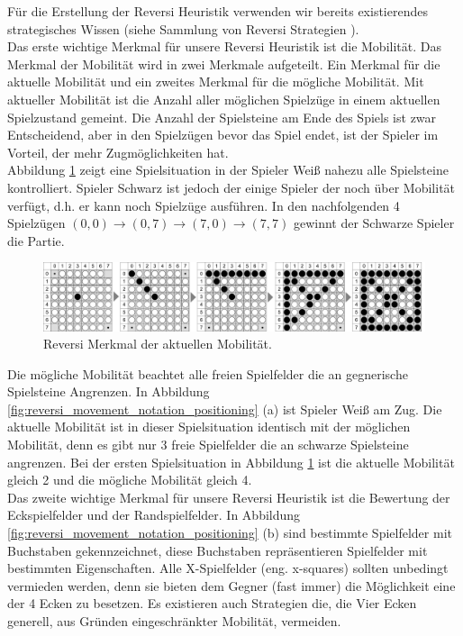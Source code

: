 Für die Erstellung der Reversi Heuristik verwenden wir bereits existierendes strategisches Wissen (siehe Sammlung von Reversi Strategien \cite{MacGuire}). \\

Das erste wichtige Merkmal für unsere Reversi Heuristik ist die Mobilität. Das Merkmal der Mobilität wird in zwei Merkmale aufgeteilt. Ein Merkmal für die aktuelle Mobilität und ein zweites Merkmal für die mögliche Mobilität. Mit aktueller Mobilität ist die Anzahl aller möglichen Spielzüge in einem aktuellen Spielzustand gemeint. Die Anzahl der Spielsteine am Ende des Spiels ist zwar Entscheidend, aber in den Spielzügen bevor das Spiel endet, ist der Spieler im Vorteil, der mehr Zugmöglichkeiten hat. \\

Abbildung \ref{fig:reversi_maximum_disk_strategy} zeigt eine Spielsituation in der Spieler Weiß nahezu alle Spielsteine kontrolliert. Spieler Schwarz ist jedoch der einige Spieler der noch über Mobilität verfügt, d.h. er kann noch Spielzüge ausführen. In den nachfolgenden 4 Spielzügen $(0,0) \rightarrow (0,7) \rightarrow (7,0) \rightarrow (7,7)$ gewinnt der Schwarze Spieler die Partie. \\

\begin{figure}[!htbp]
  \centering
  \includegraphics[scale = 0.3]{inhalt/abbildungen/reversi_maximum_disk_strategy.pdf}
  \caption{Reversi Merkmal der aktuellen Mobilität.}
  \label{fig:reversi_maximum_disk_strategy}
\end{figure}

Die mögliche Mobilität beachtet alle freien Spielfelder die an gegnerische Spielsteine Angrenzen. In Abbildung \ref{fig:reversi_movement_notation_positioning} (a) ist Spieler Weiß am Zug. Die aktuelle Mobilität ist in dieser Spielsituation identisch mit der möglichen Mobilität, denn es gibt nur 3 freie Spielfelder die an schwarze Spielsteine angrenzen. Bei der ersten Spielsituation in Abbildung \ref{fig:reversi_maximum_disk_strategy} ist die aktuelle Mobilität gleich 2 und die mögliche Mobilität gleich 4.\\

Das zweite wichtige Merkmal für unsere Reversi Heuristik ist die Bewertung der Eckspielfelder und der Randspielfelder. In Abbildung \ref{fig:reversi_movement_notation_positioning} (b) sind bestimmte Spielfelder mit Buchstaben gekennzeichnet, diese Buchstaben repräsentieren Spielfelder mit bestimmten Eigenschaften. Alle X-Spielfelder (eng. x-squares) sollten unbedingt vermieden werden, denn sie bieten dem Gegner (fast immer) die Möglichkeit eine der 4 Ecken zu besetzen. Es existieren auch Strategien die, die Vier Ecken generell, aus Gründen eingeschränkter Mobilität, vermeiden. \\

